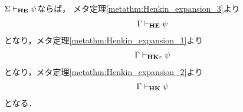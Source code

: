	\begin{sketch}
		$\Sigma \vdash_{{\scriptsize \mbox{{\bf HE}}}} \psi$ならば，
		メタ定理\ref{metathm:Henkin_expansion_3}より
		\begin{align}
			\Gamma \vdash_{{\scriptsize \mbox{{\bf HE}}}} \psi
		\end{align}
		となり，メタ定理\ref{metathm:Henkin_expansion_1}より
		\begin{align}
			\Gamma \vdash_{{\scriptsize \mbox{{\bf HK$\varepsilon$}}}} \psi
		\end{align}
		となり，メタ定理\ref{metathm:Henkin_expansion_2}より
		\begin{align}
			\Gamma \vdash_{{\scriptsize \mbox{{\bf HK}}}} \psi
		\end{align}
		となる．
		\QED
	\end{sketch}